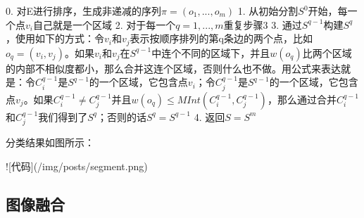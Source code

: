 0. 对E进行排序，生成非递减的序列\(\pi = (o_1,...,o_m)\)
1. 从初始分割\(S^0\)开始，每一个点\(v_i\)自己就是一个区域
2. 对于每一个\(q = 1,...,m\)重复步骤3
3. 通过\(S^{q-1}\)构建\(S^q\)，使用如下的方式：令\(v_i\)和\(v_j\)表示按顺序排列的第q条边的两个点，比如\(o_q = (v_i,v_j)\)。如果\(v_i\)和\(v_j\)在\(S^{q-1}\)中连个不同的区域下，并且\(w(o_q)\)比两个区域的内部不相似度都小，那么合并这连个区域，否则什么也不做。用公式来表达就是：令\(C_{i}^{q-1}\)是\(S^{q-1}\)的一个区域，它包含点\(v_i\)；令\(C_{j}^{q-1}\)是\(S^{q-1}\)的一个区域，它包含点\(v_j\)。如果\(C_{i}^{q-1} \neq C_{j}^{q-1}\)并且\(w(o_q) \leq MInt(C_i^{q-1},C_j^{q-1})\)，那么通过合并\(C_{i}^{q-1}\)和\(C_{j}^{q-1}\)我们得到了\(S^q\)；否则的话\(S^q = S^{q-1}\)
4. 返回\(S = S^m\)

分类结果如图所示：

![代码](/img/posts/segment.png)

\subsection{图像融合}

\ifx\usechapbib\empty
\nocite{BSTcontrol}


\fi